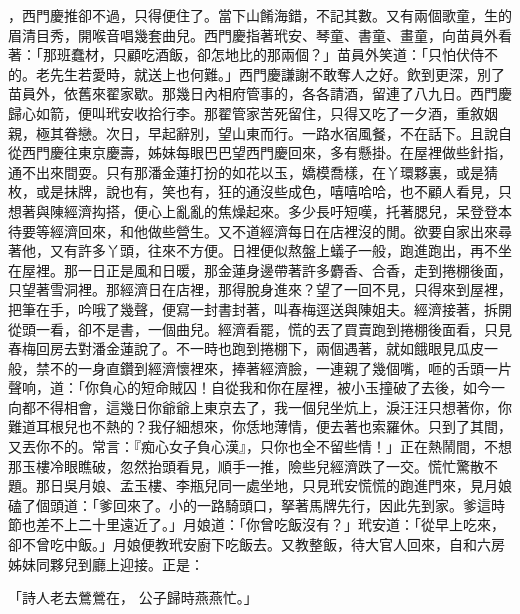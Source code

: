 ，西門慶推卻不過，只得便住了。當下山餚海錯，不記其數。又有兩個歌童，生的眉清目秀，開喉音唱幾套曲兒。西門慶指著玳安、琴童、書童、畫童，向苗員外看著：「那班蠢材，只顧吃酒飯，卻怎地比的那兩個？」苗員外笑道：「只怕伏侍不的。老先生若愛時，就送上也何難。」西門慶謙謝不敢奪人之好。飲到更深，別了苗員外，依舊來翟家歇。那幾日內相府管事的，各各請酒，留連了八九日。西門慶歸心如箭，便叫玳安收拾行李。那翟管家苦死留住，只得又吃了一夕酒，重敘姻親，極其眷戀。次日，早起辭別，望山東而行。一路水宿風餐，不在話下。且說自從西門慶往東京慶壽，姊妹每眼巴巴望西門慶回來，多有懸掛。在屋裡做些針指，通不出來間耍。只有那潘金蓮打扮的如花以玉，嬌模喬樣，在丫環夥裏，或是猜枚，或是抹牌，說也有，笑也有，狂的通沒些成色，嘻嘻哈哈，也不顧人看見，只想著與陳經濟抅搭，便心上亂亂的焦燥起來。多少長吁短嘆，托著腮兒，呆登登本待要等經濟回來，和他做些營生。又不道經濟每日在店裡沒的閒。欲要自家出來尋著他，又有許多丫頭，往來不方便。日裡便似熬盤上蟻子一般，跑進跑出，再不坐在屋裡。那一日正是風和日暖，那金蓮身邊帶著許多麝香、合香，走到捲棚後面，只望著雪洞裡。那經濟日在店裡，那得脫身進來？望了一回不見，只得來到屋裡，把筆在手，吟哦了幾聲，便寫一封書封著，叫春梅逕送與陳姐夫。經濟接著，拆開從頭一看，卻不是書，一個曲兒。經濟看罷，慌的丟了買賣跑到捲棚後面看，只見春梅回房去對潘金蓮說了。不一時也跑到捲棚下，兩個遇著，就如餓眼見瓜皮一般，禁不的一身直鑽到經濟懷裡來，捧著經濟臉，一連親了幾個嘴，咂的舌頭一片聲响，道：「你負心的短命賊囚！自從我和你在屋裡，被小玉撞破了去後，如今一向都不得相會，這幾日你爺爺上東京去了，我一個兒坐炕上，淚汪汪只想著你，你難道耳根兒也不熱的？我仔細想來，你恁地薄情，便去著也索羅休。只到了其間，又丟你不的。常言：『痴心女子負心漢』，只你也全不留些情！」正在熱鬧間，不想那玉樓冷眼瞧破，忽然抬頭看見，順手一推，險些兒經濟跌了一交。慌忙驚散不題。那日吳月娘、孟玉樓、李瓶兒同一處坐地，只見玳安慌慌的跑進門來，見月娘磕了個頭道：「爹回來了。小的一路騎頭口，拏著馬牌先行，因此先到家。爹這時節也差不上二十里遠近了。」月娘道：「你曾吃飯沒有？」玳安道：「從早上吃來，卻不曾吃中飯。」月娘便教玳安廚下吃飯去。又教整飯，待大官人回來，自和六房姊妹同夥兒到廳上迎接。正是：

「詩人老去鶯鶯在，  公子歸時燕燕忙。」

